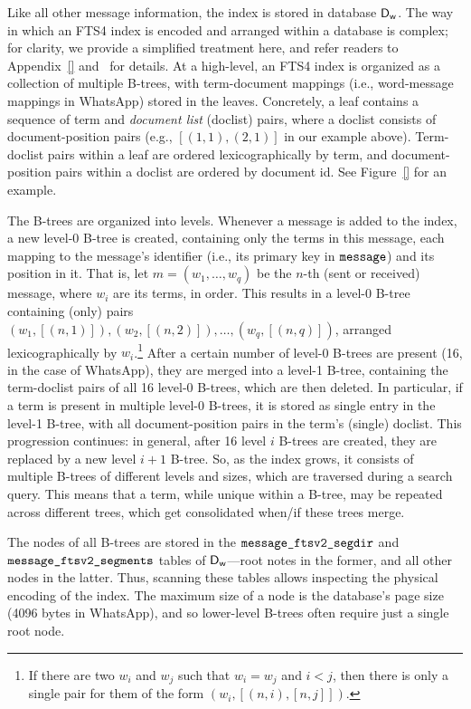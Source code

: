 Like all other message information, the index is stored in database $\textsf{D}_{\textsf{w}}$. The way in which an FTS4 index is encoded and arranged within a database is complex; for clarity, we provide a simplified treatment here, and refer readers to 
Appendix~\ref{} and~\cite{sqlite-fts4} for details.
At a high-level, an FTS4 index is organized as a collection of multiple B-trees, with term-document mappings (i.e., word-message mappings in WhatsApp) stored in the leaves. Concretely, a leaf contains a sequence of term and \emph{document list} (doclist) pairs, where a doclist consists of document-position pairs (e.g., $[(1, 1), (2, 1)]$ in our example above). Term-doclist pairs within a leaf are ordered lexicographically by term, and document-position pairs within a doclist are ordered by document id.
See Figure~\ref{} for an example. 

The B-trees are organized into levels. Whenever a message is added to the index, a new level-0 B-tree is created, containing only the terms in this message, each mapping to the message's identifier (i.e., its primary key in $\texttt{message}$) and its position in it. That is, let $m = (w_1, \dots, w_q)$ be the $n$-th (sent or received) message, where $w_i$ are its terms, in order. This results in a level-0 B-tree containing (only) pairs $(w_1, [(n, 1)]), (w_2, [(n, 2)]), \dots, (w_q, [(n, q)])$, arranged lexicographically by $w_i$.\footnote{If there are two $w_i$ and $w_j$ such that $w_i = w_j$ and $i < j$, then there is only a single pair for them of the form $(w_i, [(n, i), [n, j]])$.} After a certain number of level-0 B-trees are present (16, in the case of WhatsApp), they are merged into a level-1 B-tree, containing the term-doclist pairs of all 16 level-0 B-trees, which are then deleted. In particular, if a term is present in multiple level-0 B-trees, it is stored as single entry in the level-1 B-tree, with all document-position pairs in the term's (single) doclist. This progression continues: in general, after 16 level $i$ B-trees are created, they are replaced by a new level $i+1$ B-tree. So, as the index grows, it consists of multiple B-trees of different levels and sizes, which are traversed during a search query. This means that a term, while unique within a B-tree, may be repeated across different trees, which get consolidated when/if these trees merge.

The nodes of all B-trees are stored in the $\texttt{message\_ftsv2\_segdir}$ and $\texttt{message\_ftsv2\_segments}$ tables of $\textsf{D}_{\textsf{w}}$---root notes in the former, and all other nodes in the latter. Thus, scanning these tables allows inspecting the physical encoding of the index. The maximum size of a node is the database's page size (4096 bytes in WhatsApp), and so lower-level B-trees often require just a single root node.

